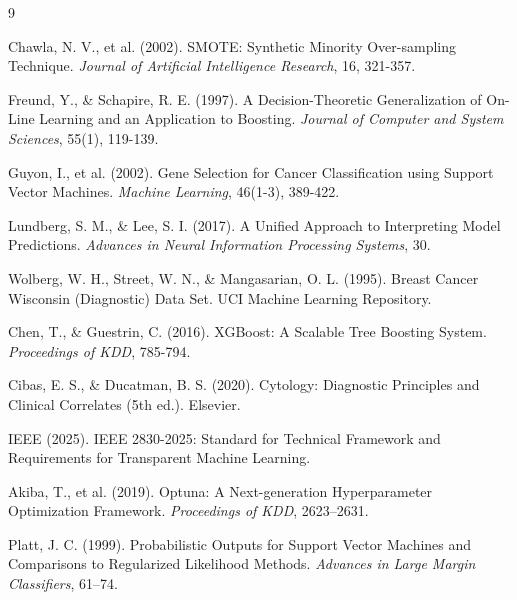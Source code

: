 \documentclass[11pt,a4paper]{article}
\begin{document}

\begin{thebibliography}{9}

Chawla, N. V., et al. (2002).
\newblock SMOTE: Synthetic Minority Over-sampling Technique.
\newblock \textit{Journal of Artificial Intelligence Research}, 16, 321-357.

Freund, Y., \& Schapire, R. E. (1997).
\newblock A Decision-Theoretic Generalization of On-Line Learning and an Application to Boosting.
\newblock \textit{Journal of Computer and System Sciences}, 55(1), 119-139.

Guyon, I., et al. (2002).
\newblock Gene Selection for Cancer Classification using Support Vector Machines.
\newblock \textit{Machine Learning}, 46(1-3), 389-422.

Lundberg, S. M., \& Lee, S. I. (2017).
\newblock A Unified Approach to Interpreting Model Predictions.
\newblock \textit{Advances in Neural Information Processing Systems}, 30.

Wolberg, W. H., Street, W. N., \& Mangasarian, O. L. (1995).
\newblock Breast Cancer Wisconsin (Diagnostic) Data Set.
\newblock UCI Machine Learning Repository.

Chen, T., \& Guestrin, C. (2016).
\newblock XGBoost: A Scalable Tree Boosting System.
\newblock \textit{Proceedings of KDD}, 785-794.

Cibas, E. S., \& Ducatman, B. S. (2020).
\newblock Cytology: Diagnostic Principles and Clinical Correlates (5th ed.).
\newblock Elsevier.

IEEE (2025).
\newblock IEEE 2830-2025: Standard for Technical Framework and Requirements for Transparent Machine Learning.

Akiba, T., et al. (2019).
\newblock Optuna: A Next-generation Hyperparameter Optimization Framework.
\newblock \textit{Proceedings of KDD}, 2623--2631.

Platt, J. C. (1999).
\newblock Probabilistic Outputs for Support Vector Machines and Comparisons to Regularized Likelihood Methods.
\newblock \textit{Advances in Large Margin Classifiers}, 61--74.

\end{thebibliography}
\end{document}
